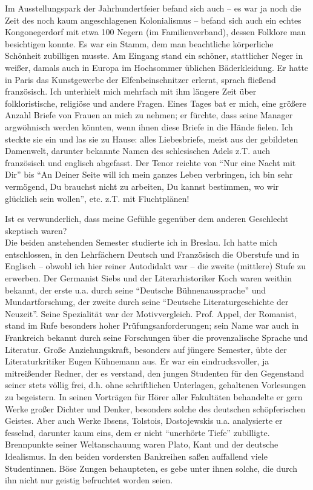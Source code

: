 Im Ausstellungspark der Jahrhundertfeier befand sich auch -- es war ja noch die Zeit des noch kaum angeschlagenen Kolonialismus -- befand sich auch ein echtes Kongonegerdorf mit etwa 100 Negern (im Familienverband), dessen Folklore man besichtigen konnte. Es war ein Stamm, dem man beachtliche körperliche Schönheit zubilligen musste. Am Eingang stand ein schöner, stattlicher Neger in weißer, damals auch in Europa im Hochsommer üblichen Bäderkleidung. Er hatte in Paris das Kunstgewerbe der Elfenbeinschnitzer erlernt, sprach fließend französisch. Ich unterhielt mich mehrfach mit ihm längere Zeit über folkloristische, religiöse und andere Fragen. Eines Tages bat er mich, eine größere Anzahl Briefe von Frauen an mich zu nehmen; er fürchte, dass seine Manager argwöhnisch werden könnten, wenn ihnen diese Briefe in die Hände fielen. Ich steckte sie ein und las sie zu Hause: alles Liebesbriefe, meist aus der gebildeten Damenwelt, darunter bekannte Namen des schlesischen Adels z.T. auch französisch und englisch abgefasst. Der Tenor reichte von \enquote{Nur eine Nacht mit Dir} bis \enquote{An Deiner Seite will ich mein ganzes Leben verbringen, ich bin sehr vermögend, Du brauchst nicht zu arbeiten, Du kannst bestimmen, wo wir glücklich sein wollen}, etc. z.T. mit Fluchtplänen!

Ist es verwunderlich, dass meine Gefühle gegenüber dem anderen Geschlecht skeptisch waren?\\

Die beiden anstehenden Semester studierte ich in Breslau. Ich hatte mich entschlossen, in den Lehrfächern Deutsch und Französisch die Oberstufe und in Englisch -- obwohl ich hier reiner Autodidakt war -- die zweite (mittlere) Stufe zu erwerben. Der Germanist Siebs und der Literarhistoriker Koch waren weithin bekannt, der erste u.a. durch seine \enquote{Deutsche Bühnenaussprache} und Mundartforschung, der zweite durch seine \enquote{Deutsche Literaturgeschichte der Neuzeit}. Seine Spezialität war der Motivvergleich. Prof. Appel, der Romanist, stand im Rufe besonders hoher Prüfungsanforderungen; sein Name war auch in Frankreich bekannt durch seine Forschungen über die provenzalische Sprache und Literatur. Große Anziehungskraft, besonders auf jüngere Semester, übte der Literaturkritiker Eugen Kühnemann aus. Er war ein eindrucksvoller, ja mitreißender Redner, der es verstand, den jungen Studenten für den Gegenstand seiner stets völlig frei, d.h. ohne schriftlichen Unterlagen, gehaltenen Vorlesungen zu begeistern. In seinen Vorträgen für Hörer aller Fakultäten behandelte er gern Werke großer Dichter und Denker, besonders solche des deutschen schöpferischen Geistes. Aber auch Werke Ibsens, Tolstois, Dostojewskis u.a. analysierte er fesselnd, darunter kaum eins, dem er nicht \enquote{unerhörte Tiefe} zubilligte. Brennpunkte seiner Weltanschauung waren Plato, Kant und der deutsche Idealismus. In den beiden vordersten Bankreihen saßen auffallend viele Studentinnen. Böse Zungen behaupteten, es gebe unter ihnen solche, die durch ihn nicht nur geistig befruchtet worden seien.

